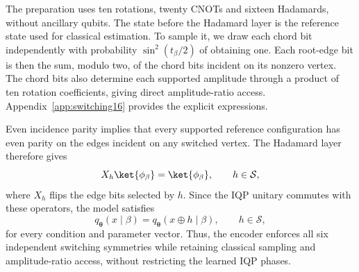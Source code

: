 The preparation uses ten rotations, twenty CNOTs and sixteen Hadamards, without ancillary qubits. The state before the Hadamard layer is the reference state used for classical estimation. To sample it, we draw each chord bit independently with probability $\sin^2(t_\beta/2)$ of obtaining one. Each root-edge bit is then the sum, modulo two, of the chord bits incident on its nonzero vertex. The chord bits also determine each supported amplitude through a product of ten rotation coefficients, giving direct amplitude-ratio access. Appendix~\ref{app:switching16} provides the explicit expressions.

Even incidence parity implies that every supported reference configuration has even parity on the edges incident on any switched vertex. The Hadamard layer therefore gives
\begin{equation}
 X_h\ket{\phi_\beta}=\ket{\phi_\beta},
 \qquad h\in\mathcal S,
\end{equation}
where $X_h$ flips the edge bits selected by $h$. Since the IQP unitary commutes with these operators, the model satisfies
\begin{equation}
 q_{\boldsymbol\theta}(x\mid\beta)
 =q_{\boldsymbol\theta}(x\oplus h\mid\beta),
 \qquad h\in\mathcal S,
\end{equation}
for every condition and parameter vector. Thus, the encoder enforces all six independent switching symmetries while retaining classical sampling and amplitude-ratio access, without restricting the learned IQP phases.
